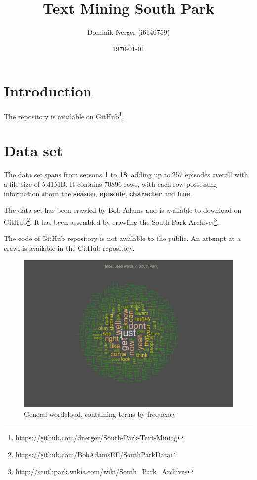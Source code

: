 \documentclass[10pt,a4paper]{article}
\author{Dominik Nerger (i6146759)}
\title{Text Mining South Park}
\date{\today}
\begin{document}
	\maketitle
	
	\tableofcontents
	
	\section{Introduction}
	
	
	The repository is available on GitHub\footnote{\url{https://github.com/dnerger/South-Park-Text-Mining}}.
	
	\section{Data set}	
	The data set spans from seasons \textbf{1} to \textbf{18}, adding up to 257 episodes overall with a file size of 5.41MB. It contains 70896 rows, with each row possessing information about the \textbf{season}, \textbf{episode}, \textbf{character} and \textbf{line}. 
	
	The data set has been crawled by Bob Adams and is available to download on GitHub\footnote{\url{https://github.com/BobAdamsEE/SouthParkData}}. It has been assembled by crawling the South Park Archives\footnote{\url{http://southpark.wikia.com/wiki/South_Park_Archives}}. 
	
	The code of GitHub repository is not available to the public. An attempt at a crawl is available in the GitHub repository.
	
	
	\begin{figure}[h]
	\centering
	\includegraphics[scale=0.9]{images/WordCloud.png}
	\caption{General wordcloud, containing terms by frequency}
	\label{fig:WordCloud}
	\end{figure}
	
\end{document}

